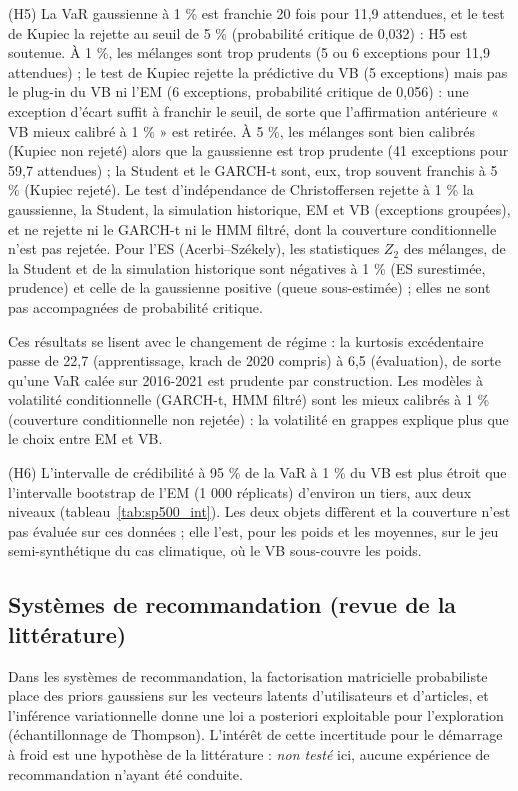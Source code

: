 (H5) La VaR gaussienne à 1 \% est franchie 20 fois pour 11,9 attendues, et le test de Kupiec la rejette au seuil de 5 \% (probabilité critique de 0,032) : H5 est soutenue. À 1 \%, les mélanges sont trop prudents (5 ou 6 exceptions pour 11,9 attendues) ; le test de Kupiec rejette la prédictive du VB (5 exceptions) mais pas le plug-in du VB ni l'EM (6 exceptions, probabilité critique de 0,056) : une exception d'écart suffit à franchir le seuil, de sorte que l'affirmation antérieure « VB mieux calibré à 1 \% » est retirée. À 5 \%, les mélanges sont bien calibrés (Kupiec non rejeté) alors que la gaussienne est trop prudente (41 exceptions pour 59,7 attendues) ; la Student et le GARCH-t sont, eux, trop souvent franchis à 5 \% (Kupiec rejeté). Le test d'indépendance de Christoffersen rejette à 1 \% la gaussienne, la Student, la simulation historique, EM et VB (exceptions groupées), et ne rejette ni le GARCH-t ni le HMM filtré, dont la couverture conditionnelle n'est pas rejetée. Pour l'ES (Acerbi--Székely), les statistiques $Z_2$ des mélanges, de la Student et de la simulation historique sont négatives à 1 \% (ES surestimée, prudence) et celle de la gaussienne positive (queue sous-estimée) ; elles ne sont pas accompagnées de probabilité critique.

Ces résultats se lisent avec le changement de régime : la kurtosis excédentaire passe de 22,7 (apprentissage, krach de 2020 compris) à 6,5 (évaluation), de sorte qu'une VaR calée sur 2016-2021 est prudente par construction. Les modèles à volatilité conditionnelle (GARCH-t, HMM filtré) sont les mieux calibrés à 1 \% (couverture conditionnelle non rejetée) : la volatilité en grappes explique plus que le choix entre EM et VB.

(H6) L'intervalle de crédibilité à 95 \% de la VaR à 1 \% du VB est plus étroit que l'intervalle bootstrap de l'EM (1 000 réplicats) d'environ un tiers, aux deux niveaux (tableau~\ref{tab:sp500_int}). Les deux objets diffèrent et la couverture n'est pas évaluée sur ces données ; elle l'est, pour les poids et les moyennes, sur le jeu semi-synthétique du cas climatique, où le VB sous-couvre les poids.


\subsection{Systèmes de recommandation (revue de la littérature)}
Dans les systèmes de recommandation, la factorisation matricielle probabiliste place des priors gaussiens sur les vecteurs latents d'utilisateurs et d'articles, et l'inférence variationnelle donne une loi a posteriori exploitable pour l'exploration (échantillonnage de Thompson). L'intérêt de cette incertitude pour le démarrage à froid est une hypothèse de la littérature : \emph{non testé} ici, aucune expérience de recommandation n'ayant été conduite.

